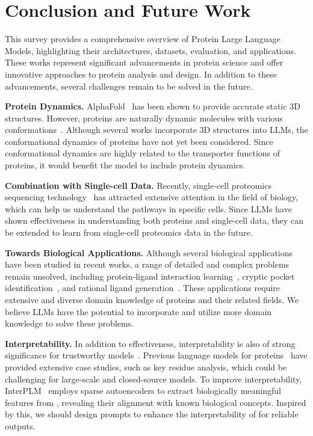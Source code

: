 \section{Conclusion and Future Work}
\label{sec:conclusion}




This survey provides a comprehensive overview of Protein Large Language Models, highlighting their architectures, datasets, evaluation, and applications. These works represent significant advancements in protein science and offer innovative approaches to protein analysis and design. In addition to these advancements, several challenges remain to be solved in the future.

\smallskip \noindent \textbf{Protein Dynamics.} AlphaFold~\cite{jumper2021highly} has been shown to provide accurate static 3D structures. However, proteins are naturally dynamic molecules with various conformations~\cite{ohnuki2024integration}. Although several works incorporate 3D structures into LLMs, the conformational dynamics of proteins have not yet been considered. Since conformational dynamics are highly related to the transporter functions of proteins, it would benefit the model to include protein dynamics.

\smallskip \noindent \textbf{Combination with Single-cell Data.} Recently, single-cell proteomics sequencing technology~\cite{li2024scprotein,liu2024geneverse,bennett2023single} has attracted extensive attention in the field of biology, which can help us understand the pathways in specific cells. Since LLMs have shown effectiveness in understanding both proteins and single-cell data, they can be extended to learn from single-cell proteomics data in the future.


\smallskip \noindent \textbf{Towards Biological Applications.} Although several biological applications have been studied in recent works, a range of detailed and complex problems remain unsolved, including protein-ligand interaction learning~\cite{koh2024physicochemical}, cryptic pocket identification~\cite{ge2024exploring}, and rational ligand generation~\cite{li2024deep}. These applications require extensive and diverse domain knowledge of proteins and their related fields. We believe LLMs have the potential to incorporate and utilize more domain knowledge to solve these problems.


\smallskip \noindent \textbf{Interpretability.} In addition to effectiveness, interpretability is also of strong significance for trustworthy models~\cite{huang2024trustllm}. Previous language models for proteins~\cite{gu2023hierarchical,vecchietti2024recent} have provided extensive case studies, such as key residue analysis, which could be challenging for large-scale and closed-source models. To improve interpretability, InterPLM~\cite{simon2024interplm} employs sparse autoencoders to extract biologically meaningful features from \proteinllms, revealing their alignment with known biological concepts. Inspired by this, we should design prompts to enhance the interpretability of \proteinllms for reliable outputs.

